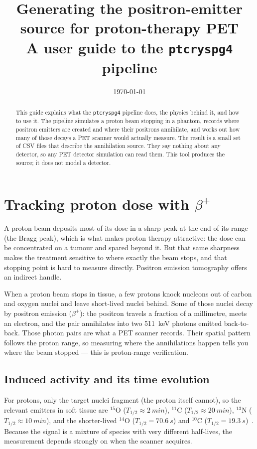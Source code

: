 \documentclass[11pt]{article}
\title{Generating the positron-emitter source for proton-therapy PET\\
\large A user guide to the \texttt{ptcryspg4} pipeline}
\author{}
\date{\today}
\newcommand{\bplus}{\beta^{+}}
\newcommand{\Cl}[1]{{}^{#1}\mathrm{C}}
\newcommand{\Ox}[1]{{}^{#1}\mathrm{O}}
\newcommand{\Nt}[1]{{}^{#1}\mathrm{N}}
\begin{document}
\maketitle

\begin{abstract}
This guide explains what the \texttt{ptcryspg4} pipeline does, the physics behind
it, and how to use it. The pipeline simulates a proton beam stopping in a phantom,
records where positron emitters are created and where their positrons annihilate,
and works out how many of those decays a PET scanner would actually measure. The
result is a small set of CSV files that describe the annihilation source. They say
nothing about any detector, so any PET detector simulation can read them. This tool
produces the source; it does not model a detector.
\end{abstract}

\section{Tracking proton dose with \texorpdfstring{$\bplus$}{beta+}}
\label{sec:physics-intro}

A proton beam deposits most of its dose in a sharp peak at the end of its range
(the Bragg peak), which is what makes proton therapy attractive: the dose can be
concentrated on a tumour and spared beyond it. But that same sharpness makes the
treatment sensitive to where exactly the beam stops, and that stopping point is
hard to measure directly. Positron emission tomography offers an indirect handle.

When a proton beam stops in tissue, a few protons knock nucleons out of carbon and
oxygen nuclei and leave short-lived nuclei behind. Some of those nuclei decay by
positron emission ($\bplus$): the positron travels a fraction of a millimetre, meets
an electron, and the pair annihilates into two \SI{511}{keV} photons emitted
back-to-back. Those photon pairs are what a PET scanner records. Their spatial
pattern follows the proton range, so measuring where the annihilations happen tells
you where the beam stopped --- this is proton-range verification.

\subsection{Induced activity and its time evolution}
\label{sec:activity}

For protons, only the target nuclei fragment (the proton itself cannot), so the
relevant emitters in soft tissue are $\Ox{15}$ ($T_{1/2}\approx\SI{2}{min}$),
$\Cl{11}$ ($T_{1/2}\approx\SI{20}{min}$), $\Nt{13}$ ($T_{1/2}\approx\SI{10}{min}$),
and the shorter-lived $\Ox{14}$ ($T_{1/2}=\SI{70.6}{s}$) and $\Cl{10}$
($T_{1/2}=\SI{19.3}{s}$)~\cite{zhu2013proton,parodi2008comparison}. Because the
signal is a mixture of species with very different half-lives, the measurement
depends strongly on when the scanner acquires.
\end{document}
